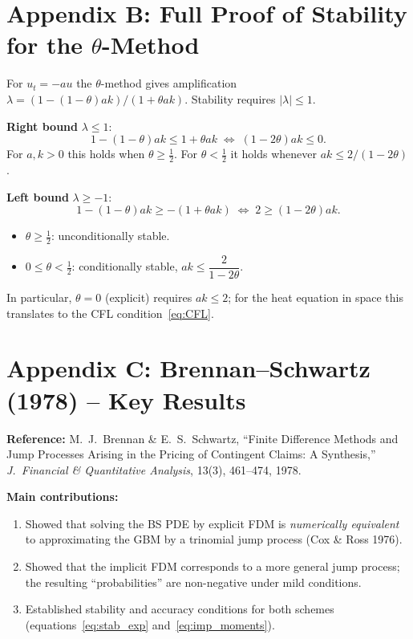 \documentclass[12pt,a4paper]{article}
\theoremstyle{plain}
\theoremstyle{definition}
\theoremstyle{remark}
\begin{document}
\section{Appendix B: Full Proof of Stability for the $\theta$-Method}

For $u_{t}=-au$ the $\theta$-method gives amplification
$\lambda=(1-(1-\theta)ak)/(1+\theta ak)$.
Stability requires $|\lambda|\leq1$.

\textbf{Right bound} $\lambda\leq1$:
\[
  1-(1-\theta)ak\leq1+\theta ak
  \;\Longleftrightarrow\; (1-2\theta)ak\leq0.
\]
For $a,k>0$ this holds when $\theta\geq\tfrac{1}{2}$.
For $\theta<\tfrac{1}{2}$ it holds whenever $ak\leq2/(1-2\theta)$.

\textbf{Left bound} $\lambda\geq-1$:
\[
  1-(1-\theta)ak\geq-(1+\theta ak)
  \;\Longleftrightarrow\; 2\geq(1-2\theta)ak.
\]

\begin{keybox}
\begin{itemize}
  \item $\theta\geq\tfrac{1}{2}$: unconditionally stable.
  \item $0\leq\theta<\tfrac{1}{2}$: conditionally stable,
        $ak\leq\dfrac{2}{1-2\theta}$.
\end{itemize}
In particular, $\theta=0$ (explicit) requires $ak\leq2$; for the
heat equation in space this translates to the CFL condition~\eqref{eq:CFL}.
\end{keybox}

\section{Appendix C: Brennan--Schwartz (1978) -- Key Results}

\textbf{Reference:} M.\ J.\ Brennan \& E.\ S.\ Schwartz,
``Finite Difference Methods and Jump Processes Arising in the Pricing
of Contingent Claims: A Synthesis,''
\textit{J.\ Financial \& Quantitative Analysis}, 13(3), 461--474, 1978.

\medskip
\noindent\textbf{Main contributions:}
\begin{enumerate}
  \item Showed that solving the BS PDE by explicit FDM is \emph{numerically
        equivalent} to approximating the GBM by a trinomial jump process
        (Cox \& Ross 1976).
  \item Showed that the implicit FDM corresponds to a more general jump
        process; the resulting ``probabilities'' are non-negative under
        mild conditions.
  \item Established stability and accuracy conditions for both schemes
        (equations~\eqref{eq:stab_exp} and~\eqref{eq:imp_moments}).
\end{enumerate}
\end{document}
